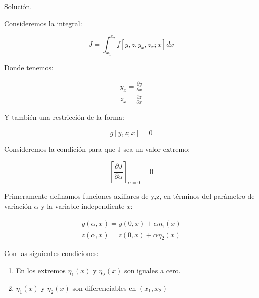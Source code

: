 

\noindent

Solución.

\vspace*{0.5cm}

Consideremos la integral:

\begin{equation}
    J = \int_{x_{1}}^{x_{2}} f\left[ y, z, y_{x}, z_{x}; x \right] dx
\end{equation}

Donde tenemos:

\begin{gather}
    y_{x} = \frac{\partial y}{\partial x} \\
    z_{x} = \frac{\partial z}{\partial x}
\end{gather}

\vspace*{0.5cm}

Y también una restricción de la forma:

\vspace*{0.5cm}

\begin{equation}
    g\left[ y,z;x \right] = 0
\end{equation}

\vspace*{0.5cm}

Consideremos la condición para que J sea un valor extremo:

\vspace*{0.5cm}

\begin{equation}
    \left[ \frac{\partial J}{\partial \alpha} \right]_{\alpha = 0} = 0
\end{equation}

\vspace*{0.5cm}

Primeramente definamos funciones axiliares de y,z, en términos del
parámetro de variación $\alpha$ y la variable independiente $x$:

\begin{gather}
    y(\alpha,x) = y(0,x) + \alpha \eta_{1} (x) \\
    z(\alpha,x) = z(0,x) + \alpha \eta_{2} (x)
\end{gather}

\vspace*{0.5cm}

Con las siguientes condiciones:

\begin{enumerate}
    \item En los extremos $\eta_{1} (x)$ y $\eta_{2} (x)$ son iguales a cero.
    \item $\eta_{1} (x)$ y $\eta_{2} (x)$ son diferenciables en $(x_{1}, x_{2})$
\end{enumerate}


